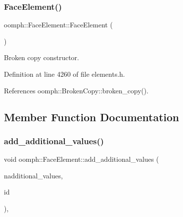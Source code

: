 \mbox{\label{classoomph_1_1FaceElement_a21acf2a56f732a3378674f74525effbf}} 
\subsubsection{\texorpdfstring{Face\+Element()}{FaceElement()}\hspace{0.1cm}{\footnotesize\ttfamily [2/2]}}
{\footnotesize\ttfamily oomph\+::\+Face\+Element\+::\+Face\+Element (\begin{DoxyParamCaption}\item[{const \hyperlink{classoomph_1_1FaceElement}{Face\+Element} \&}]{ }\end{DoxyParamCaption})\hspace{0.3cm}{\ttfamily [inline]}}



Broken copy constructor. 



Definition at line 4260 of file elements.\+h.



References oomph\+::\+Broken\+Copy\+::broken\+\_\+copy().



\subsection{Member Function Documentation}
\mbox{\label{classoomph_1_1FaceElement_a652aa3d84b6d91e0ce93bdb2e6718338}} 
\subsubsection{\texorpdfstring{add\+\_\+additional\+\_\+values()}{add\_additional\_values()}}
{\footnotesize\ttfamily void oomph\+::\+Face\+Element\+::add\+\_\+additional\+\_\+values (\begin{DoxyParamCaption}\item[{const \hyperlink{classoomph_1_1Vector}{Vector}$<$ unsigned $>$ \&}]{nadditional\+\_\+values,  }\item[{const unsigned \&}]{id }\end{DoxyParamCaption})\hspace{0.3cm}{\ttfamily [inline]}, {\ttfamily [protected]}}



